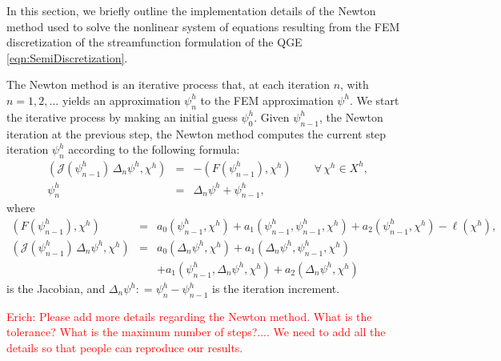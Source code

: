 In this section, we briefly outline the implementation details of the Newton
method used to solve the nonlinear system of equations resulting from the FEM
discretization of the streamfunction formulation of the QGE
\eqref{eqn:SemiDiscretization}.

The Newton method is an iterative process that, at each iteration $n$, with $n=1, 2, \dots$ yields an approximation $\psi^h_n$ to the FEM approximation $\psi^h$.
We start the iterative process by making an initial guess $\psi^h_0$.
Given $\psi^h_{n-1}$, the Newton iteration at the previous step, the Newton method computes the current step iteration $\psi^h_n$ according to the following formula:
\begin{eqnarray}
  \left(
  \mathcal{J}(\psi^h_{n-1}) \, \Delta_n \psi^h , \chi^h
  \right)
  &=& -
  \left(
  F(\psi^h_{n-1}) , \chi^h
  \right)
  \qquad
  \forall \, \chi^h \in X^h ,
  \label{eqn:Newton} \\[0.2cm]
  \psi^h_n &=& \Delta_n \psi^h + \psi^h_{n-1},
  \label{eqn:NewPsi}
\end{eqnarray}
where
\begin{eqnarray*}
  \left(
  F(\psi^h_{n-1}) , \chi^h
  \right)
  &=&  a_0(\psi^h_{n-1},\chi^h) + a_1(\psi^h_{n-1},\psi^h_{n-1},\chi^h) + a_2(\psi^h_{n-1},\chi^h) - \ell(\chi^h), \\[0.2cm]
  \left(
  \mathcal{J}(\psi^h_{n-1}) \, \Delta_n \psi^h , \chi^h
  \right)
  &=& a_0(\Delta_n \psi^h,\chi^h)
  + a_1(\Delta_n \psi^h,\psi^h_{n-1},\chi^h)
  \nonumber \\[0.2cm]
  && + a_1(\psi^h_{n-1},\Delta_n \psi^h,\chi^h)
  + a_2(\Delta_n \psi^h,\chi^h)
\end{eqnarray*}
is the Jacobian, and
$\Delta_n \psi^h : = \psi^h_n - \psi^h_{n-1}$ is the iteration increment.

\textcolor{red}{Erich: Please add more details regarding the Newton method.  What is the tolerance?  What is the maximum number of steps?.... We need to add all the details so that people can reproduce our results.}
